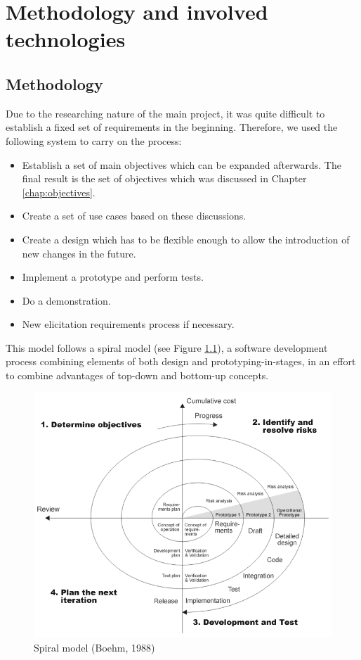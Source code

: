\chapter{Methodology and involved technologies}
\label{chap:methodology}

\section{Methodology}
\label{section:methodology-spiral}

Due to the researching nature of the main project, it was quite difficult to
establish a fixed set of requirements in the beginning. Therefore, we used
the following system to carry on the process:

\begin{itemize}
  \item Establish a set of main objectives which can be expanded afterwards. The
  final result is the set of objectives which was discussed in Chapter
  \ref{chap:objectives}.
  \item Create a set of use cases based on these discussions.
  \item Create a design which has to be flexible enough to allow the
  introduction of new changes in the future.
  \item Implement a prototype and perform tests.
  \item Do a demonstration.
  \item New elicitation requirements process if necessary.
\end{itemize}

This model follows a spiral model (see Figure \ref{img:spiral}), a software
development process combining elements of both design and prototyping-in-stages, in an effort to combine 
advantages of top-down and bottom-up concepts.

\begin{figure}
 \begin{center}
 \includegraphics[scale=0.33]{img/spiral_model.png}
 \end{center}
 \caption{\label{img:spiral}Spiral model (Boehm, 1988)}
\end{figure}


